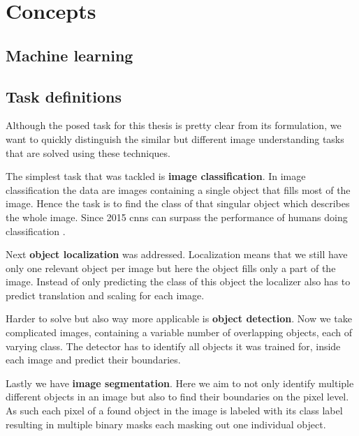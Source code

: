 %
\chapter{Concepts}
\label{sec:concepts}


\section{Machine learning}
\label{sec:concepts:ml}

\section{Task definitions}
\label{sec:concepts:tasks}
Although the posed task for this thesis is pretty clear from its formulation, we want to quickly distinguish the similar but different image understanding tasks that are solved using these techniques.

The simplest task that was tackled is \textbf{image classification}. In image classification the data are images containing a single object that fills most of the image. Hence the task is to find the class of that singular object which describes the whole image. Since 2015 \glspl{cnn} can surpass the performance of humans doing classification \citep{he_delving_2015}.

Next \textbf{object localization} was addressed. Localization means that we still have only one relevant object per image but here the object fills only a part of the image. Instead of only predicting the class of this object the localizer also has to predict translation and scaling for each image.

Harder to solve but also way more applicable is \textbf{object detection}. Now we take complicated images, containing a variable number of overlapping objects, each of varying class. The detector has to identify all objects it was trained for, inside each image and predict their boundaries.

Lastly we have \textbf{image segmentation}. Here we aim to not only identify multiple different objects in an image but also to find their boundaries on the pixel level. As such each pixel of a found object in the image is labeled with its class label resulting in multiple binary masks each masking out one individual object.

